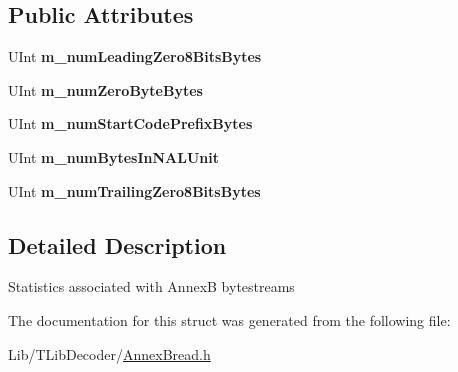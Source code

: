 \subsection*{Public Attributes}
\begin{DoxyCompactItemize}
\item 
\mbox{\label{struct_annex_b_stats_a556514dec1c3e2809885e3a3d28fd120}} 
U\+Int {\bfseries m\+\_\+num\+Leading\+Zero8\+Bits\+Bytes}
\item 
\mbox{\label{struct_annex_b_stats_a11772dc9f6e30684372f339c0f82a362}} 
U\+Int {\bfseries m\+\_\+num\+Zero\+Byte\+Bytes}
\item 
\mbox{\label{struct_annex_b_stats_adec7ceaf29da5abcb1c12af030211220}} 
U\+Int {\bfseries m\+\_\+num\+Start\+Code\+Prefix\+Bytes}
\item 
\mbox{\label{struct_annex_b_stats_af2f5be6976825eff9fc819b5d6a69913}} 
U\+Int {\bfseries m\+\_\+num\+Bytes\+In\+N\+A\+L\+Unit}
\item 
\mbox{\label{struct_annex_b_stats_ab01e1cc2a61a694deca7ecd53cdbc07b}} 
U\+Int {\bfseries m\+\_\+num\+Trailing\+Zero8\+Bits\+Bytes}
\end{DoxyCompactItemize}


\subsection{Detailed Description}
Statistics associated with AnnexB bytestreams 

The documentation for this struct was generated from the following file\+:\begin{DoxyCompactItemize}
\item 
Lib/\+T\+Lib\+Decoder/\hyperlink{_annex_bread_8h}{Annex\+Bread.\+h}\end{DoxyCompactItemize}
